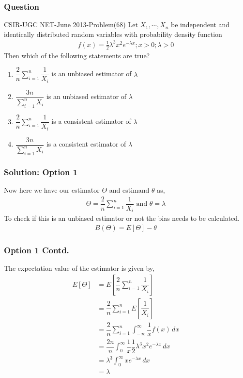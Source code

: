 \documentclass{beamer}
\begin{document}
\begin{frame}
\frametitle{Question}
\begin{block}{CSIR-UGC NET-June 2013-Problem(68)}
Let $ X_1, \cdots , X_n $ be independent and identically distributed random variables with probability density function
\begin{align*}
    f(x) = \frac{1}{2} \lambda^3x^2e^{-\lambda x} ; x>0 ; \lambda > 0
\end{align*}
Then which of the following statements are true?
\begin{enumerate}
    \item $\dfrac{2}{n} \sum_{i=1}^{n} \dfrac{1}{X_i} $ is an unbiased estimator of $ \lambda$
    \item $\dfrac{3n}{\sum_{i=1}^{n} X_i } $ is an unbiased estimator of $ \lambda$ \\
    \item $\dfrac{2}{n} \sum_{i=1}^{n} \dfrac{1}{X_i} $ is a consistent estimator of $ \lambda$
    \item $\dfrac{3n}{\sum_{i=1}^{n} X_i } $ is a consistent estimator of $ \lambda$
\end{enumerate}
\end{block}
\end{frame}

\begin{frame}
\frametitle{Solution: Option 1}
 Now here we have our estimator $ \Theta$ and estimand $ \theta $ as,
 \begin{align}
     \Theta = \dfrac{2}{n} \sum_{i=1}^{n} \dfrac{1}{X_i} \text{  and  }
     \theta = \lambda
 \end{align}
 To check if this is an unbiased estimator or not the bias needs to be calculated.
 \begin{align}
    B(\Theta ) = E[\Theta ] - \theta
\end{align}
\end{frame}











\begin{frame}
\frametitle{Option 1 Contd.}
The expectation value of the estimator is given by, 
\begin{align}
    E[\Theta ] &= E  \left[   \dfrac{2}{n} \sum_{i=1}^{n} \dfrac{1}{X_i}  \right] \\
    & = \dfrac{2}{n} \sum_{i=1}^{n} E  \left[ \dfrac{1}{X_i}  \right] \\
    & =  \dfrac{2}{n} \sum_{i=1}^{n} \int_{-\infty}^{\infty} \dfrac{1}{x} f(x)\,dx \\
    \label{eq1}
    & = \dfrac{2n}{n} \int_{0}^{\infty} \dfrac{1}{x} \dfrac{1}{2} \lambda^3x^2e^{-\lambda x}\,dx \\
    & = \lambda^3  \int_{0}^{\infty}  x e^{-\lambda x}\,dx \\
    &= \lambda
\end{align}
\end{frame}
\end{document}
